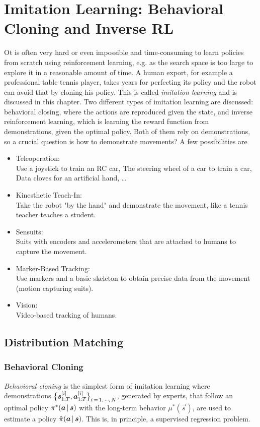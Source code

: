 \chapter{Imitation Learning: Behavioral Cloning and Inverse RL}
	Ot is often very hard or even impossible and time-consuming to learn policies from scratch using reinforcement learning, e.g. as the search space is too large to explore it in a reasonable amount of time. A human export, for example a professional table tennis player, takes years for perfecting its policy and the robot can avoid that by cloning his policy. This is called \emph{imitation learning} and is discussed in this chapter. Two different types of imitation learning are discussed: behavioral closing, where the actions are reproduced given the state, and inverse reinforcement learning, which is learning the reward function from demonstrations, given the optimal policy. Both of them rely on demonstrations, so a crucial question is how to demonstrate movements? A few possibilities are
	\begin{itemize}
		\item Teleoperation: \\
			Use a joystick to train an RC car, The steering wheel of a car to train a car, Data cloves for an artificial hand, \dots
		\item Kinesthetic Teach-In: \\
			Take the robot "by the hand" and demonstrate the movement, like a tennis teacher teaches a student.
		\item Sensuits: \\
			Suits with encoders and accelerometers that are attached to humans to capture the movement.
		\item Marker-Based Tracking: \\
			Use markers and a basic skeleton to obtain precise data from the movement (motion capturing suits).
		\item Vision: \\
			Video-based tracking of humans.
	\end{itemize}

	\section{Distribution Matching}
		\subsection{Behavioral Cloning}
			\emph{Behavioral cloning} is the simplest form of imitation learning where demonstrations \( \big\{ \bm{s}_{1:T}^{[i]}, \bm{a}_{1:T}^{[i]} \big\}_{i \,=\, 1,\,\cdots\!,\,N} \), generated by experts, that follow an optimal policy \( \pi^\ast(\bm{a} \,\vert\, \bm{s}) \) with the long-term behavior \( \mu^\ast(\vec{s}) \), are used to estimate a policy \( \hat{\pi}(\bm{a} \,\vert\, \bm{s}) \). This is, in principle, a supervised regression problem.


